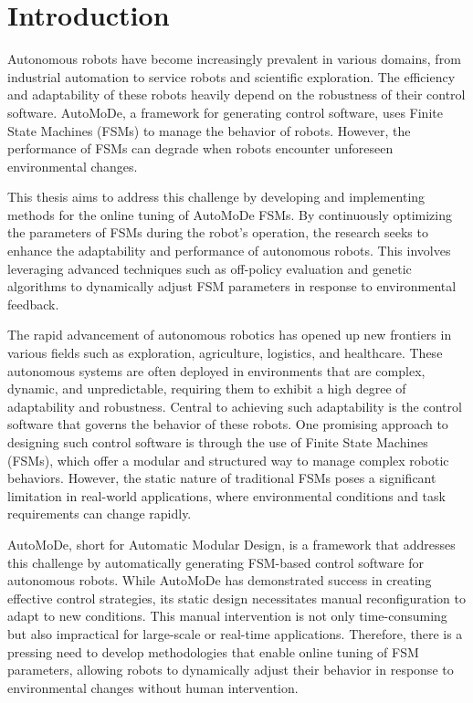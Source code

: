 \documentclass{ULBreport}
\begin{document}
\chapter{Introduction}
Autonomous robots have become increasingly prevalent in various domains, from industrial automation to service robots and scientific exploration. The efficiency and adaptability of these robots heavily depend on the robustness of their control software. AutoMoDe, a framework for generating control software, uses Finite State Machines (FSMs) to manage the behavior of robots. However, the performance of FSMs can degrade when robots encounter unforeseen environmental changes.

This thesis aims to address this challenge by developing and implementing methods for the online tuning of AutoMoDe FSMs. By continuously optimizing the parameters of FSMs during the robot's operation, the research seeks to enhance the adaptability and performance of autonomous robots. This involves leveraging advanced techniques such as off-policy evaluation and genetic algorithms to dynamically adjust FSM parameters in response to environmental feedback.




The rapid advancement of autonomous robotics has opened up new frontiers in various fields such as exploration, agriculture, logistics, and healthcare. These autonomous systems are often deployed in environments that are complex, dynamic, and unpredictable, requiring them to exhibit a high degree of adaptability and robustness. Central to achieving such adaptability is the control software that governs the behavior of these robots. One promising approach to designing such control software is through the use of Finite State Machines (FSMs), which offer a modular and structured way to manage complex robotic behaviors. However, the static nature of traditional FSMs poses a significant limitation in real-world applications, where environmental conditions and task requirements can change rapidly.

AutoMoDe, short for Automatic Modular Design, is a framework that addresses this challenge by automatically generating FSM-based control software for autonomous robots. While AutoMoDe has demonstrated success in creating effective control strategies, its static design necessitates manual reconfiguration to adapt to new conditions. This manual intervention is not only time-consuming but also impractical for large-scale or real-time applications. Therefore, there is a pressing need to develop methodologies that enable online tuning of FSM parameters, allowing robots to dynamically adjust their behavior in response to environmental changes without human intervention.
\end{document}
